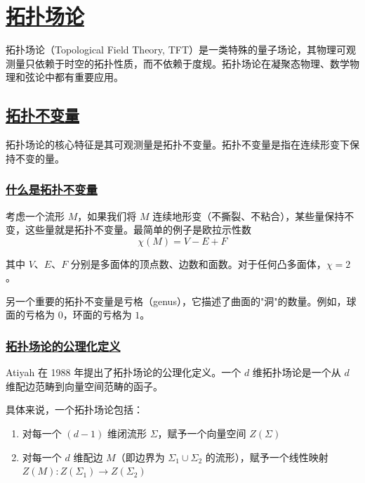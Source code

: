 \chapter{\protect\hyperlink{:}{拓扑场论}}

拓扑场论（Topological Field Theory, TFT）是一类特殊的量子场论，其物理可观测量只依赖于时空的拓扑性质，而不依赖于度规。拓扑场论在凝聚态物理、数学物理和弦论中都有重要应用。

\section{\protect\hyperlink{:}{拓扑不变量}}

拓扑场论的核心特征是其可观测量是拓扑不变量。拓扑不变量是指在连续形变下保持不变的量。

\subsection{\protect\hyperlink{:}{什么是拓扑不变量}}

考虑一个流形 $M$，如果我们将 $M$ 连续地形变（不撕裂、不粘合），某些量保持不变，这些量就是拓扑不变量。最简单的例子是欧拉示性数
\begin{equation}
    \chi(M) = V - E + F
\end{equation}

其中 $V$、$E$、$F$ 分别是多面体的顶点数、边数和面数。对于任何凸多面体，$\chi = 2$。

另一个重要的拓扑不变量是亏格（genus），它描述了曲面的"洞"的数量。例如，球面的亏格为 $0$，环面的亏格为 $1$。

\subsection{\protect\hyperlink{:}{拓扑场论的公理化定义}}

Atiyah 在 1988 年提出了拓扑场论的公理化定义。一个 $d$ 维拓扑场论是一个从 $d$ 维配边范畴到向量空间范畴的函子。

具体来说，一个拓扑场论包括：
\begin{enumerate}
    \item 对每一个 $(d-1)$ 维闭流形 $\Sigma$，赋予一个向量空间 $Z(\Sigma)$
    \item 对每一个 $d$ 维配边 $M$（即边界为 $\Sigma_1 \cup \Sigma_2$ 的流形），赋予一个线性映射 $Z(M): Z(\Sigma_1) \to Z(\Sigma_2)$
\end{enumerate}

